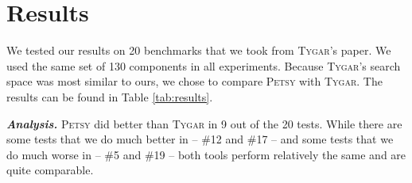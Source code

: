 \documentclass[acmsmall,nonacm]{acmart}
\begin{document}





\section{Results}



We tested our results on 20 benchmarks that we took from \textsc{Tygar}'s \cite{tygar} paper. 
We used the same set of 130 components in all experiments. Because \textsc{Tygar}'s search 
space was most similar to ours, we chose to compare \textsc{Petsy} with \textsc{Tygar}.
The results can be found in Table \ref{tab:results}.



\vspace{2mm}
\noindent \textbf{\textit{Analysis.}} 
\textsc{Petsy} did better than \textsc{Tygar} in 9 out of the 20 tests. 
While there are some tests that we do much better in -- \#12 and \#17 --
and some tests that we do much worse in -- \#5 and \#19 -- both tools perform
relatively the same and are quite comparable.

\end{document}
